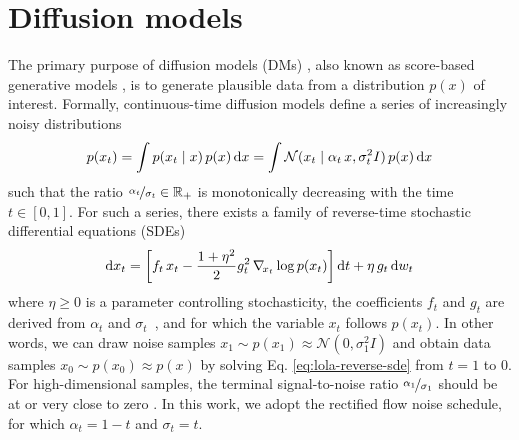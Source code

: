 \section{Diffusion models} \label{sec:lola-diffusion}

The primary purpose of diffusion models (DMs) \cite{sohl-dickstein2015deep, ho2020denoising}, also known as score-based generative models \cite{song2019generative, song2021scorebased}, is to generate plausible data from a distribution $p(x)$ of interest. Formally, continuous-time diffusion models define a series of increasingly noisy distributions
\begin{equation}
    p(x_t) = \int p(x_t \mid x) \, p(x) \operatorname{d}\!{x} = \int \mathcal{N}(x_t \mid \alpha_t \, x, \sigma_t^2 I) \, p(x) \operatorname{d}\!{x}
\end{equation}
such that the ratio $\nicefrac{\alpha_t}{\sigma_t} \in \mathbb{R}_+$ is monotonically decreasing with the time $t \in [0, 1]$. For such a series, there exists a family of reverse-time stochastic differential equations (SDEs) \cite{anderson1982reversetime, sarkka2019applied, song2021scorebased}
\begin{equation} \label{eq:lola-reverse-sde}
    \operatorname{d}\!{x_t} = \left[ f_t \, x_t - \frac{1 + \eta^2}{2} g_t^2 \, \nabla_{\!{x_t}} \log p(x_t) \right] \operatorname{d}\!{t} + \eta \, g_t \operatorname{d}\!{w_t}
\end{equation}
where $\eta \geq 0$ is a parameter controlling stochasticity, the coefficients $f_t$ and $g_t$ are derived from $\alpha_t$ and $\sigma_t$~\cite{anderson1982reversetime, sarkka2019applied, song2021scorebased}, and for which the variable $x_t$ follows $p(x_t)$. In other words, we can draw noise samples $x_1 \sim p(x_1) \approx \mathcal{N}(0, \sigma_1^2 I)$ and obtain data samples $x_0 \sim p(x_0) \approx p(x)$ by solving Eq. \eqref{eq:lola-reverse-sde} from $t = 1$ to $0$. For high-dimensional samples, the terminal signal-to-noise ratio $\nicefrac{\alpha_1}{\sigma_1}$ should be at or very close to zero \cite{lin2024common}. In this work, we adopt the rectified flow \cite{liu2023flow, lipman2023flow, esser2024scaling} noise schedule, for which $\alpha_t = 1 - t$ and $\sigma_t = t$.

